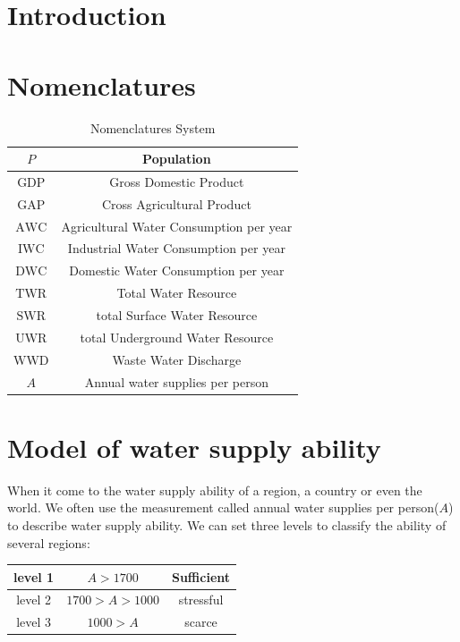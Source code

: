 
\section{Introduction}

\section{Nomenclatures}

\begin{table}[!htb]
  \caption{Nomenclatures System}
  \centering
  \begin{tabular}{||c|c||}
    \hline
    $P$   & Population \\
    \hline
    $\text{GDP}$ & Gross Domestic Product \\
    \hline
    $\text{GAP}$ & Cross Agricultural Product \\
    \hline
    $\text{AWC}$ & Agricultural Water Consumption per year \\
    \hline
    $\text{IWC}$ & Industrial Water Consumption per year \\
    \hline
    $\text{DWC}$ & Domestic Water Consumption per year \\
    \hline
    $\text{TWR}$ & Total Water Resource \\
    \hline
    $\text{SWR}$ & total Surface Water Resource \\
    \hline
    $\text{UWR}$ & total Underground Water Resource \\
    \hline

    $\text{WWD}$ & Waste Water Discharge \\
    \hline

    $A$          & Annual water supplies per person \\
    \hline
  \end{tabular}
\end{table}

\section{Model of water supply ability}
  When it come to the water supply ability of a region, a country or even the world. We often use the measurement called annual water supplies per person($A$) to describe water supply ability\cite{1}. We can set three levels to classify the ability of several regions:
  \begin{table}[!htb]
    \centering
    \begin{tabular}{|c||c|c|}
    \hline
    level 1   & $A>1700$ & Sufficient \\
    \hline
    level 2   & $1700>A>1000$ & stressful \\
    \hline
    level 3   & $1000>A$ & scarce \\
    \hline
    \end{tabular}
  \end{table}

